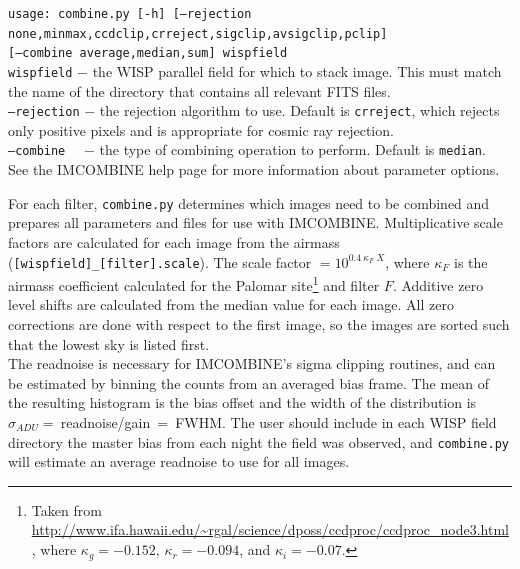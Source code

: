 \documentclass{article}
\begin{document}
\texttt{usage: combine.py [-h] [--rejection {none,minmax,ccdclip,crreject,sigclip,avsigclip,pclip}] \\
\indent \indent \indent \indent \indent \texttt{[--combine {average,median,sum}] wispfield}} \\

\texttt{wispfield} $-$ \hangindent=2.7cm the WISP parallel field for which 
to stack image. This must match the name of the directory that contains all
relevant FITS files.\\

\texttt{--rejection} $-$ \hangindent=2.7cm the rejection algorithm to use. 
Default is \texttt{crreject}, which rejects only positive pixels and is 
appropriate for cosmic ray rejection. \\

\texttt{--combine} ~~$-$ \hangindent=2.7cm the type of combining operation 
to perform. Default is \texttt{median}. \\

\noindent See the IMCOMBINE help page for more information about parameter 
options.

\noindent For each filter, \texttt{combine.py} determines which images
need to be combined and prepares all parameters and files for use with 
IMCOMBINE. Multiplicative scale factors are calculated for each image
from the airmass (\texttt{[wispfield]\_[filter].scale}). 
The scale factor $=10^{0.4 ~ \kappa_F~ X}$, where $\kappa_F$ is the airmass 
coefficient calculated for the Palomar site\footnote{Taken from 
\url{http://www.ifa.hawaii.edu/~rgal/science/dposs/ccdproc/ccdproc_node3.html}, 
where $\kappa_g = -0.152$, $\kappa_r=-0.094$, and $\kappa_i=-0.07$.} 
and filter $F$.
Additive zero level shifts are calculated from the median value for 
each image. All zero corrections are done with respect to the first image,
so the images are sorted such that the lowest sky is listed first.  \\

\noindent The readnoise is necessary for IMCOMBINE's sigma clipping routines,
and can be estimated by binning the counts from an averaged bias frame. The
mean of the resulting histogram is the bias offset and 
the width of the distribution is $\sigma_{ADU} =~$readnoise/gain$~=~$FWHM.
The user should include in each WISP field directory the master bias from
each night the field was observed, and \texttt{combine.py} will estimate
an average readnoise to use for all images.\\
\end{document}
